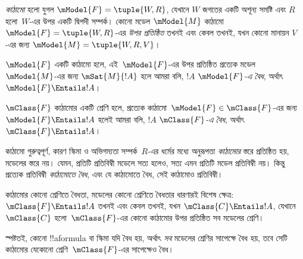 \documentclass[../../../include/open-logic-section]{subfiles}
\begin{document}


\begin{defn}
  \emph{কাঠামো} হলো যুগল $\mModel{F} = \tuple{W,R}$, যেখানে $W$ জগতের একটি অশূন্য সমষ্টি এবং $R$ হলো~$W$-এর উপর একটি দ্বিপদী সম্পর্ক। কোনো মডেল
  $\mModel{M}$ কাঠামো $\mModel{F} = \tuple{W,R}$-এর \emph{উপর প্রতিষ্ঠিত} তখনই এবং কেবল তখনই, যখন কোনো মানায়ন $V$-এর জন্য $\mModel{M} = \tuple{W, R, V}$।
\end{defn}

\begin{defn}
  $\mModel{F}$ একটি কাঠামো হলে, এই~$\mModel{F}$-এর উপর প্রতিষ্ঠিত প্রত্যেক মডেল~$\mModel{M}$-এর জন্য $\mSat{M}{!A}$ হলে আমরা বলি, $!A$ \emph{$\mModel{F}$-এ বৈধ,} অর্থাৎ $\mModel{F} \Entails !A$।

  $\mClass{F}$ কাঠামোর একটি শ্রেণি হলে, প্রত্যেক কাঠামো~$\mModel{F} \in \mClass{F}$-এর জন্য $\mModel{F} \Entails
  !A$ হলেই আমরা বলি, $!A$ \emph{$\mClass{F}$-এ বৈধ,} অর্থাৎ $\mClass{F} \Entails !A$।
\end{defn}

কাঠামো গুরুত্বপূর্ণ, কারণ স্কিমা ও অভিগম্যতা সম্পর্ক~$R$-এর ধর্মের মধ্যে অনুরূপতা \emph{কাঠামোর} স্তরে প্রতিষ্ঠিত হয়, মডেলের স্তরে নয়। যেমন, প্রতিটি প্রতিবিম্বী মডেলে  সত্য হলেও,  সত্য এমন প্রতিটি মডেল প্রতিবিম্বী নয়। কিন্তু প্রত্যেক প্রতিবিম্বী \emph{কাঠামোতে}  \emph{বৈধ}, এবং যে কাঠামোতে  বৈধ, সেই কাঠামোও প্রতিবিম্বী।

\begin{rem}
কাঠামোর কোনো শ্রেণিতে বৈধতা, মডেলের কোনো শ্রেণিতে বৈধতার ধারণারই বিশেষ ক্ষেত্র: $\mClass{F} \Entails !A$ তখনই এবং কেবল তখনই, যখন $\mClass{C} \Entails !A$, যেখানে $\mClass{C}$ হলো~$\mClass{F}$-এর কোনো কাঠামোর উপর প্রতিষ্ঠিত সব মডেলের শ্রেণি।

স্পষ্টতই, কোনো !!a{formula} বা স্কিমা যদি বৈধ হয়, অর্থাৎ \emph{সব} মডেলের শ্রেণির সাপেক্ষে বৈধ হয়, তবে সেটি কাঠামোর যেকোনো শ্রেণি~$\mClass{F}$-এর সাপেক্ষেও বৈধ।
\end{rem}
\end{document}
